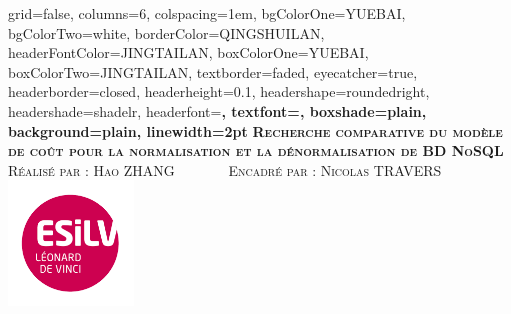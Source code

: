 \documentclass[portrait,final,a0paper,fontscale=0.277]{baposter}
\begin{document}


\begin{poster}%
  {
  grid=false,
  columns=6,
  colspacing=1em,
  bgColorOne=YUEBAI,
  bgColorTwo=white,
  borderColor=QINGSHUILAN,
  headerFontColor=JINGTAILAN,
  boxColorOne=YUEBAI,
  boxColorTwo=JINGTAILAN,
  textborder=faded,
  eyecatcher=true,
  headerborder=closed,
  headerheight=0.1\textheight,
  headershape=roundedright,
  headershade=shadelr,
  headerfont=\Large\bf\textsc, %
  textfont={\setlength{\parindent}{1.5em}},
  boxshade=plain,
  background=plain,
  linewidth=2pt
  }
  {
  } 
  {\bf\textsc{Recherche comparative du modèle de coût pour la normalisation et la dénormalisation de BD NoSQL}\vspace{0.5em}}
  {\textsc{Réalisé par : Hao ZHANG \ \ \ \ \ \ \ Encadré par : Nicolas TRAVERS}}
  {%
    \includegraphics[height=9.0em]{logos/logo_esilv.png}
  }

    \newcommand{\colouredcircle}{%
      \tikz{\useasboundingbox (-0.2em,-0.32em) rectangle(0.2em,0.32em); \draw[draw=black,fill=lightblue,line width=0.03em] (0,0) circle(0.18em);}}


\end{poster}
\end{document}
